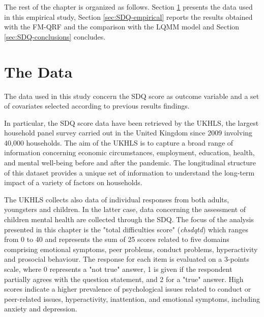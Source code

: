 \vspace{0.15in}

\noindent The rest of the chapter is organized as follows. Section \ref{sec:SDQ-data} presents the data used in this empirical study, Section \ref{sec:SDQ-empirical} reports the results obtained with the FM-QRF and the comparison with the LQMM model and Section  \ref{sec:SDQ-conclusions} concludes.

\section{The Data}
\label{sec:SDQ-data}

The data used in this study concern the SDQ score as outcome variable and a set of  covariates selected according to previous results findings.

\vspace{0.15in}

\noindent In particular, the SDQ score data have been retrieved by the UKHLS, the largest household panel survey carried out in the United Kingdom since 2009 involving 40,000 households. The aim of the UKHLS is to capture a broad range of information concerning economic circumstances, employment, education, health, and mental well-being before and after the pandemic. The longitudinal structure of this dataset provides a unique set of information to understand the long-term impact of a variety of factors on households.

\vspace{0.15in}

\noindent The UKHLS collects also data of individual responses from both adults, youngsters and children. In the latter case, data concerning the assessment of children mental health are collected through the SDQ. The focus of the analysis presented in this chapter is the "total difficulties score" (\textit{chsdqtd}) which ranges from 0 to 40 and represents the sum of 25 scores related to five domains comprising emotional symptoms, peer problems, conduct problems, hyperactivity and prosocial behaviour. The response for each item is evaluated on a 3-points scale, where 0 represents a "not true" answer, 1 is given if the respondent partially agrees with the question statement, and 2 for a "true" answer. High scores indicate a higher prevalence of psychological issues related to conduct or peer-related issues, hyperactivity, inattention, and emotional symptoms, including anxiety and depression.


\vspace{0.15in}

